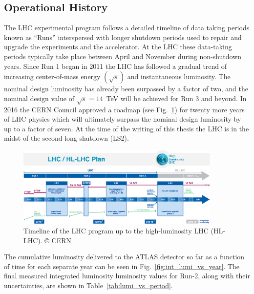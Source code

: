 \subsection{Operational History}
The LHC experimental program follows a detailed timeline of data taking periods known as ``Runs'' interspersed with longer shutdown periods used to repair and upgrade the experiments and the accelerator.
At the LHC these data-taking periods typically take place between April and November during non-shutdown years.
Since Run 1 began in 2011 the LHC has followed a gradual trend of increasing center-of-mass energy $(\sqrt{s})$ and instantaneous luminosity.
The nominal design luminosity has already been surpassed by a factor of two, and the nominal design value of $\sqrt{s} = 14$\ TeV will be achieved for Run 3 and beyond.
In 2016 the CERN Council approved a roadmap (see Fig.~\ref{fig:lhc_timeline}) for twenty more years of LHC physics which will ultimately surpass the nominal design luminosity by up to a factor of seven.
At the time of the writing of this thesis the LHC is in the midst of the second long shutdown (LS2).

\begin{figure}
	\centering
	\includegraphics[width=0.9\textwidth]{lhc_timeline}
	\caption{Timeline of the LHC program up to the high-luminosity LHC (HL-LHC). © CERN}
	\label{fig:lhc_timeline}
\end{figure}

The cumulative luminosity delivered to the ATLAS detector so far as a function of time for each separate year can be seen in Fig.~\ref{fig:int_lumi_vs_year}.
The final measured integrated luminosity luminosity values for Run-2, along with their uncertainties, are shown in Table~\ref{tab:lumi_vs_period}.


